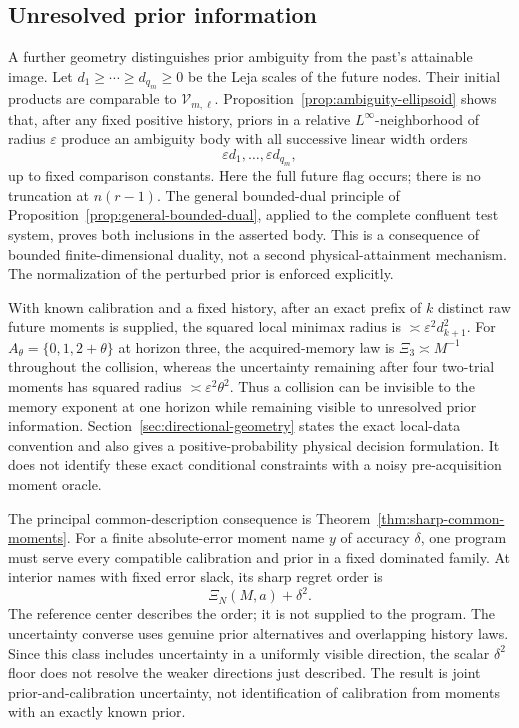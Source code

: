 \subsection{Unresolved prior information}
A further geometry distinguishes prior ambiguity from the past's
attainable image. Let $d_1\ge\cdots\ge d_{q_m}\ge0$ be the Leja
scales of the future nodes. Their initial products are comparable to
$\mathcal V_{m,\ell}$. Proposition~\ref{prop:ambiguity-ellipsoid}
shows that, after any fixed positive history, priors in a relative
$L^\infty$-neighborhood of radius $\varepsilon$ produce an ambiguity
body with all successive linear width orders
\[
 \varepsilon d_1,\ldots,\varepsilon d_{q_m},
\]
up to fixed comparison constants. Here the full future flag occurs;
there is no truncation at $n(r-1)$. The general bounded-dual principle of
Proposition~\ref{prop:general-bounded-dual}, applied to the complete
confluent test system, proves both inclusions in the asserted body.
This is a consequence of bounded finite-dimensional duality, not a
second physical-attainment mechanism.
The normalization of the perturbed prior is enforced explicitly.

With known calibration and a fixed history, after an exact prefix of
$k$ distinct raw future moments is supplied,
the squared local minimax radius is
$\asymp\varepsilon^2d_{k+1}^2$. For
$A_\theta=\{0,1,2+\theta\}$ at horizon three, the acquired-memory law
is $\Xi_3\asymp M^{-1}$ throughout the collision, whereas the
uncertainty remaining after four two-trial moments has squared radius
$\asymp\varepsilon^2\theta^2$. Thus a collision can be invisible to
the memory exponent at one horizon while remaining visible to unresolved
prior information. Section~\ref{sec:directional-geometry} states the
exact local-data convention and also gives a positive-probability
physical decision formulation. It does not identify these exact
conditional constraints with a noisy pre-acquisition moment oracle.

The principal common-description consequence is
Theorem~\ref{thm:sharp-common-moments}. For a finite absolute-error
moment name $y$ of accuracy $\delta$, one program must serve every
compatible calibration and prior in a fixed dominated family. At
interior names with fixed error slack, its sharp regret order is
\[
 \Xi_N(M,a)+\delta^2.
\]
The reference center describes the order; it is not supplied to the
program. The uncertainty converse uses genuine prior alternatives and
overlapping history laws. Since this class includes uncertainty in a
uniformly visible direction, the scalar $\delta^2$ floor does not
resolve the weaker directions just described. The result is joint
prior-and-calibration uncertainty, not identification of calibration
from moments with an exactly known prior.

